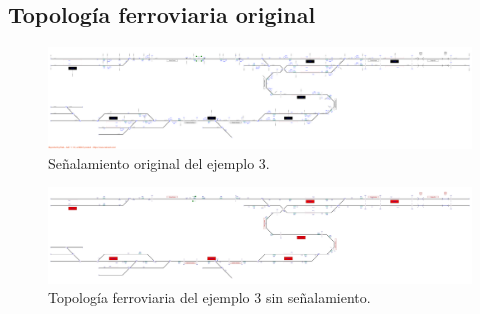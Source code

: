 \subsection{Topología ferroviaria original}

\lipsum[2]


\begin{figure}[H]
	\centering
	\includegraphics[width=1\textwidth]{resultados-obtenidos/ejemplo3/images/3_original.png}
	\centering\caption{Señalamiento original del ejemplo 3.}
\end{figure}

\lipsum[2]

\begin{figure}[H]
	\centering
	\includegraphics[width=1\textwidth]{resultados-obtenidos/ejemplo3/images/3_empty.png}
	\centering\caption{Topología ferroviaria del ejemplo 3 sin señalamiento.}
\end{figure}

\lipsum[2]
